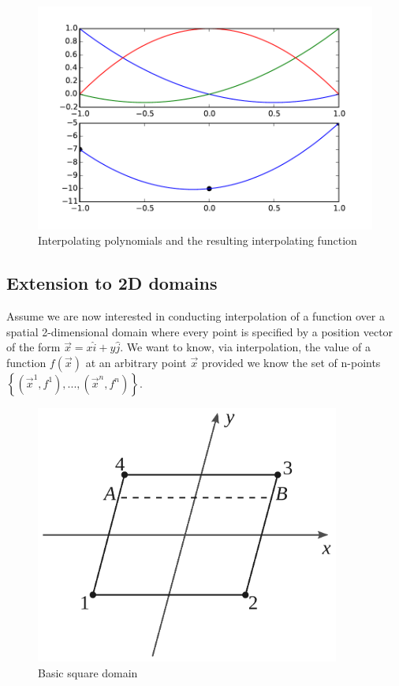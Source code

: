 \begin{figure}[H]
\centering
\includegraphics[width=16cm]{func.pdf}
\caption{Interpolating polynomials and the resulting interpolating function}
\label{fig:pols}
\end{figure}

\subsection*{Extension to 2D domains}
Assume we are now interested in conducting interpolation of a function over a spatial 2-dimensional domain where every point is specified by a position vector of the form $\vec x = x\hat i + y\hat j$. We want to know, via interpolation, the value of a function $f(\vec x)$ at an arbitrary point $\vec x$ provided we know the set of n-points $\left\{ {({{\vec x}^1},{f^1}),...,({{\vec x}^n},{f^n})} \right\}$.


\begin{figure}[H]
\centering
\includegraphics[width=10cm]{element.pdf}
\caption{Basic square domain}
\label{fig:element}
\end{figure}


